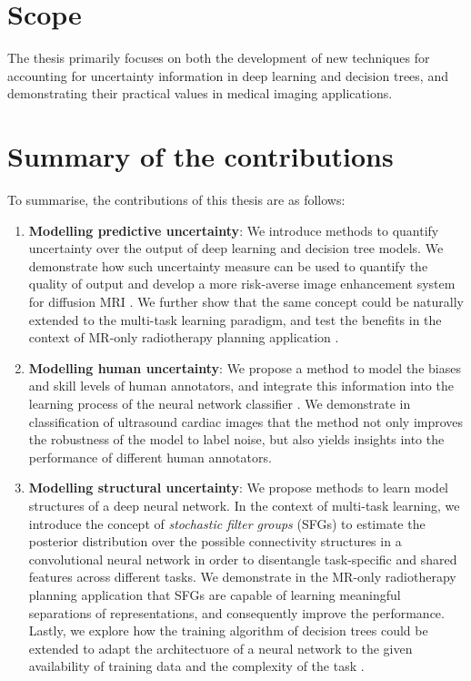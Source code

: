 \section*{Scope}
The thesis primarily focuses on both the development of new techniques for accounting for uncertainty information in deep learning and decision trees, and demonstrating their practical values in medical imaging applications. 

\section*{Summary of the contributions} 
To summarise, the contributions of this thesis are as follows:

\begin{enumerate}
	\item \textbf{Modelling predictive uncertainty}:  We introduce methods to quantify uncertainty over the output of deep learning and decision tree models. We demonstrate how such uncertainty measure can be used to quantify the quality of output and develop a more risk-averse image enhancement system for diffusion MRI \cite{tanno2016bayesian,tanno2017bayesian,tannonimg2019}.  We further show that the same concept could be naturally extended to the multi-task learning paradigm, and test the benefits in the context of MR-only radiotherapy planning application \cite{bragman2018multi}. 
	
	\item \textbf{Modelling human uncertainty}: We propose a method to model the biases and skill levels of human annotators, and integrate this information into the learning process of the neural network classifier \cite{tanno2019learning}. We demonstrate in classification of ultrasound cardiac images that the method not only improves the robustness of the model to label noise, but also yields insights into the performance of different human annotators. 
	
	\item \textbf{Modelling structural uncertainty}: We propose methods to learn model structures of a deep neural network. In the context of multi-task learning, we introduce the concept of \emph{stochastic filter  groups} (SFGs) \cite{sfg2019} to estimate the posterior distribution over the possible connectivity structures in a convolutional neural network in order to disentangle task-specific and shared features across different tasks. We demonstrate in the MR-only radiotherapy planning application that SFGs are capable of learning meaningful separations of representations, and consequently improve the performance. Lastly, we explore how the training algorithm of decision trees could be extended to adapt the architectuore of a neural network to the given availability of training data and the complexity of the task \cite{AdaptiveNeuralTrees19}. 
	
\end{enumerate}

